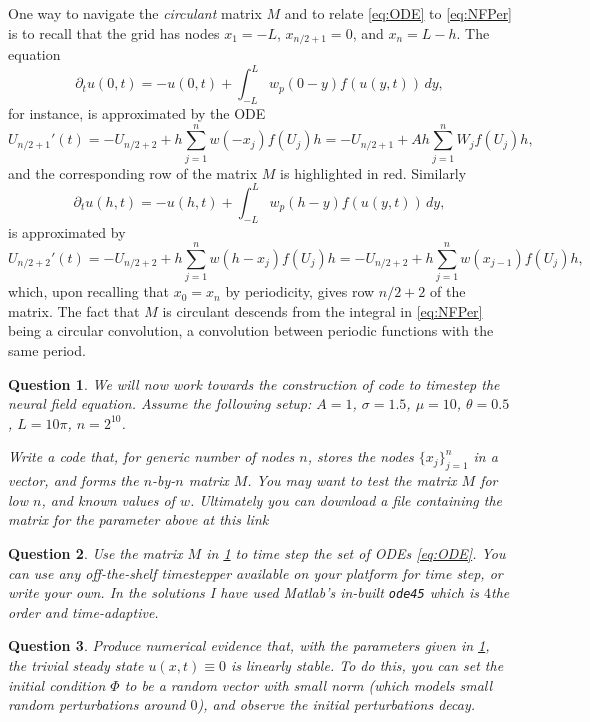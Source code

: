 \documentclass[a4paper]{siamonline220329}
\theoremstyle{plain}
\newtheorem{question}{Question}
\begin{document}
One way to navigate the \textit{circulant} matrix $M$ and to relate \cref{eq:ODE} to
\cref{eq:NFPer} is to
recall that the grid has nodes $x_1=-L$, $x_{n/2+1} = 0$, and $x_{n}=L-h$. The
equation
\[
 \partial_{t}u(0,t) = -u(0,t) + \int_{-L}^Lw_p(0-y)f(u(y,t))\, dy,
\]
for instance, is approximated by the ODE
\[
  U_{n/2+1}'(t) = -U_{n/2+2} + h \sum_{j=1}^n w(-x_j) f(U_j) h
                = -U_{n/2+1} + Ah \sum_{j=1}^n W_jf(U_j) h,
\]
and the corresponding row of the matrix $M$ is highlighted in red. Similarly
\[
 \partial_{t}u(h,t) = -u(h,t) + \int_{-L}^Lw_p(h-y)f(u(y,t))\, dy,
\]
is approximated by
\[
  U_{n/2+2}'(t) = -U_{n/2+2} + h \sum_{j=1}^n w(h-x_j) f(U_j) h
                = -U_{n/2+2} + h \sum_{j=1}^n w(x_{j-1}) f(U_j) h,
\]
which, upon recalling that $x_0=x_n$ by periodicity, gives row $n/2+2$ of the matrix.
The fact that $M$ is circulant descends from the integral in \cref{eq:NFPer} being
a circular convolution, a convolution between periodic functions with the same period.

\begin{question} \label{question:codeMatrix}
  We will now work towards the construction of code to timestep the neural field
  equation. Assume the following setup: $A = 1$, $\sigma=1.5$, $\mu =10$,
  $\theta = 0.5$, $L = 10\pi$, $n = 2^{10}$.

  Write a code that, for generic number of nodes $n$, stores the nodes
  $\{x_j\}_{j=1}^n$ in a vector, and forms the $n$-by-$n$ matrix $M$. You may want to
  test the matrix $M$ for low $n$, and known values of $w$. Ultimately you can
  download a file containing the matrix for the parameter above at this link
\end{question}

\begin{question} 
  Use the matrix $M$ in \cref{question:codeMatrix} to time step the set of ODEs
  \cref{eq:ODE}. You can use any off-the-shelf timestepper available on your platform
  for time step, or write your own. In the solutions I have used Matlab's in-built
  \texttt{ode45} which is $4$the order and time-adaptive.
\end{question}

\begin{question} 
  Produce numerical evidence that, with the parameters given in
  \cref{question:codeMatrix}, the trivial steady state $u(x,t) \equiv 0$ is linearly
  stable. To do this, you can set the initial condition $\Phi$ to be a random vector
  with small norm (which models small random perturbations around $0$), and observe the
  initial perturbations decay.
\end{question}
\end{document}
